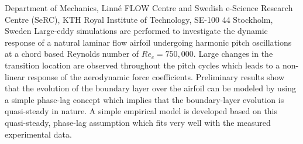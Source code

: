 %
%
%
%
%
%
%
\paperaffiliation
{%
Department of Mechanics, Linn\'e FLOW Centre and Swedish e-Science Research Centre (SeRC), KTH Royal Institute of Technology, SE-100 44 Stockholm, Sweden 
}%
%
%
%
\papervolume{}%
%
%
\paperpages{}%
%
\paperyear{}%
%
\papersummary%
{%
	Large-eddy simulations are performed to investigate the dynamic response of a natural laminar flow airfoil undergoing harmonic pitch oscillations at a chord based Reynolds number of $Re_{c}=750,000$. Large changes in the transition location are observed throughout the pitch cycles which leads to a non-linear response of the aerodynamic force coefficients. Preliminary results show that the evolution of the boundary layer over the airfoil can be modeled by using a simple phase-lag concept which implies that the boundary-layer evolution is quasi-steady in nature. A simple empirical model is developed based on this quasi-steady, phase-lag assumption which fits very well with the measured experimental data.
}%
%
\graphicspath{{paper2/imgs/}{paper2/imgs2/}}%
%
%
%
